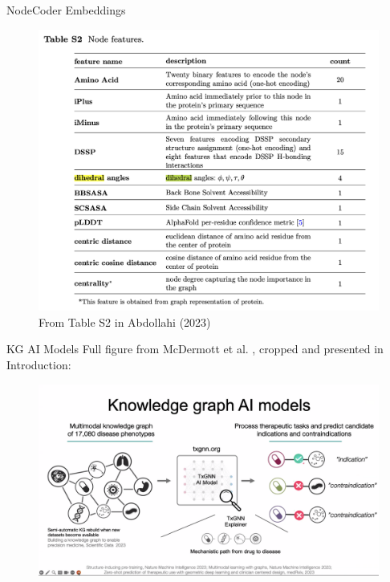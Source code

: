 \documentclass{beamer}
\begin{document}
\begin{frame}{NodeCoder Embeddings}
    \begin{figure}
        \centering 
        \includegraphics[scale=0.3]{NodeCoder_S2_Embeddings.png}
        \caption{From Table S2 in Abdollahi (2023) \cite{abdollahi_nodecoder_2023}}
    \end{figure}
\end{frame}

\begin{frame}{KG AI Models}
    Full figure from McDermott et al. \cite{mcdermott_structure-inducing_2023}, cropped and presented in Introduction:
    \begin{figure}
        \centering
        \includegraphics[scale=0.13]{Junwei_KG_Models_Infograph.png}
    \end{figure}
\end{frame}
\end{document}
